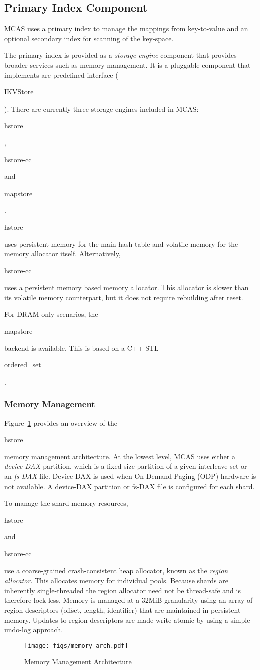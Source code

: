 \documentclass[letterpaper,twocolumn,10pt]{article}
\newcommand{\hstore}{\code{hstore}\xspace}
\newcommand{\hstorecc}{\code{hstore-cc}\xspace}
\newcommand{\mapstore}{\code{mapstore}\xspace}
\newcommand{\code}[1]{\begin{ttcodefont}#1\end{ttcodefont}}
\begin{document}
\subsection{Primary Index Component}

MCAS uses a primary index to manage the mappings from key-to-value and
an optional secondary index for scanning of the key-space.

The primary index is provided as a \textit{storage engine} component
that provides broader services such as memory management.  It is a
pluggable component that implements are predefined interface
(\code{IKVStore}).  There are currently three storage engines included
in MCAS: \hstore, \hstorecc and \mapstore.

\hstore uses persistent memory for the main hash table and volatile
memory for the memory allocator itself.  Alternatively, \hstorecc uses
a persistent memory based memory allocator.  This allocator is slower
than its volatile memory counterpart, but it does not require
rebuilding after reset.

For DRAM-only scenarios, the \mapstore backend is available.  This is
based on a C++ STL \code{ordered\_set}.


\subsubsection{Memory Management}

Figure~\ref{fig:mem_arch} provides an overview of the \hstore memory
management architecture.  At the lowest level, MCAS uses either a
\textit{device-DAX} partition, which is a fixed-size partition of a
given interleave set or an \textit{fs-DAX} file. Device-DAX is used
when On-Demand Paging (ODP) hardware is not available.  A device-DAX
partition or fs-DAX file is configured for each shard.

To manage the shard memory resources, \hstore and \hstorecc use a
coarse-grained crash-consistent heap allocator, known as the
\textit{region allocator}. This allocates memory for individual pools.
Because shards are inherently single-threaded the region allocator
need not be thread-safe and is therefore lock-less.  Memory is managed
at a 32MiB granularity using an array of region descriptors (offset,
length, identifier) that are maintained in persistent memory.  Updates
to region descriptors are made write-atomic by using a simple undo-log
approach.

\begin{figure}
\centering
\texttt{[image: figs/memory\_arch.pdf]}
\caption{Memory Management Architecture}
\label{fig:mem_arch}
\end{figure}
\end{document}
